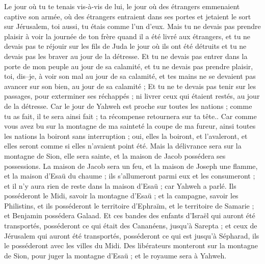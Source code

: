 \begin{multicols}{2}
Le jour où tu te tenais vis-à-vis de lui, le jour où des étrangers emmenaient captive son armée, où des étrangers entraient dans ses portes et jetaient le sort sur Jérusalem, toi aussi, tu étais comme l'un d'eux.
Mais tu ne devais pas prendre plaisir à voir la journée de ton frère quand il a été livré aux étrangers, et tu ne devais pas te réjouir sur les fils de Juda le jour où ils ont été détruits et tu ne devais pas les braver au jour de la détresse.
Et tu ne devais pas entrer dans la porte de mon peuple au jour de sa calamité, et tu ne devais pas prendre plaisir, toi, dis–je, à voir son mal au jour de sa calamité, et tes mains ne se devaient pas avancer sur son bien, au jour de sa calamité ;
Et tu ne te devais pas tenir sur les passages, pour exterminer ses réchappés ; ni livrer ceux qui étaient restés, au jour de la détresse.
Car le jour de Yahweh est proche sur toutes les nations ; comme tu as fait, il te sera ainsi fait ; ta récompense retournera sur ta tête..
Car comme vous avez bu sur la montagne de ma sainteté la coupe de ma fureur, ainsi toutes les nations la boiront sans interruption ; oui, elles la boiront, et l’avaleront, et elles seront comme si elles n’avaient point été.
Mais la délivrance sera sur la montagne de Sion, elle sera sainte, et la maison de Jacob possédera ses possessions.
La maison de Jacob sera un feu, et la maison de Joseph une flamme, et la maison d'Esaü du chaume ; ils s’allumeront parmi eux et les consumeront ; et il n’y aura rien de reste dans la maison d’Esaü ; car Yahweh a parlé.
Ils posséderont le Midi, savoir la montagne d’Esaü ; et la campagne, savoir les Philistins, et ils posséderont le territoire d’Ephraïm, et le territoire de Samarie ; et Benjamin possédera Galaad.
Et ces bandes des enfants d’Israël qui auront été transportés, posséderont ce qui était des Cananéens, jusqu’à Sarepta ; et ceux de Jérusalem qui auront été transportés, posséderont ce qui est jusqu’à Sépharad, ils le posséderont avec les villes du Midi.
Des libérateurs monteront sur la montagne de Sion, pour juger la montagne d'Esaü ; et le royaume sera à Yahweh.
\PPE{}
\end{multicols}

